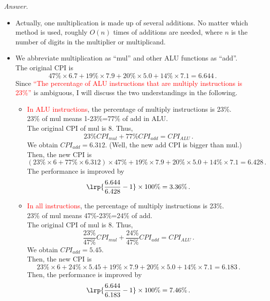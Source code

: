 \documentclass[english]{thesis}
\begin{document}
\textit{Answer.}
\begin{itemize}
	\item Actually, one multiplication is made up of several additions.
	No matter which method is used, roughly $O(n)$ times of additions are needed, where $n$ is the number of digits in the multiplier or multiplicand.
	\item We abbreviate multiplication as ``mul'' and other ALU functions as ``add''.\\
	The original CPI is
	\[47\%\times 6.7+19\%\times 7.9+20\%\times 5.0+14\%\times 7.1=6.644\,.\]
	Since \textcolor{red}{``The percentage of ALU instructions that are multiply instructions is 23\%''} is ambiguous, I will discuss the two understandings in the following.
	\begin{itemize}
		\item \textcolor{red}{In ALU instructions}, the percentage of multiply instructions is 23\%.\\
		23\% of mul means 1-23\%=77\% of add in ALU.\\
		The original CPI of mul is 8.
		Thus,
		\[23\% CPI_{mul} + 77\% CPI_{add} = CPI_{ALU}\,.\]
		We obtain $CPI_{add}=6.312$. (Well, the new add CPI is bigger than mul.)\\
		Then, the new CPI is
		\[(23\%\times 6+77\%\times 6.312)\times 47\%+19\%\times 7.9+20\%\times 5.0+14\%\times 7.1=6.428\,.\]
		The performance is improved by
		\[\lrp{\frac{6.644}{6.428}-1}\times 100\%=3.36\%\,.\]
		\item \textcolor{red}{In all instructions}, the percentage of multiply instructions is 23\%.\\
		23\% of mul means 47\%-23\%=24\% of add.\\
		The original CPI of mul is 8.
		Thus,
		\[\frac{23\%}{47\%} CPI_{mul} + \frac{24\%}{47\%} CPI_{add} = CPI_{ALU}\,.\]
		We obtain $CPI_{add}=5.45$.\\
		Then, the new CPI is
		\[23\%\times 6+24\%\times 5.45+19\%\times 7.9+20\%\times 5.0+14\%\times 7.1=6.183\,.\]
		Then, the performance is improved by
		\[\lrp{\frac{6.644}{6.183}-1}\times 100\%=7.46\%\,.\]
	\end{itemize}
\end{itemize}
\end{document}
